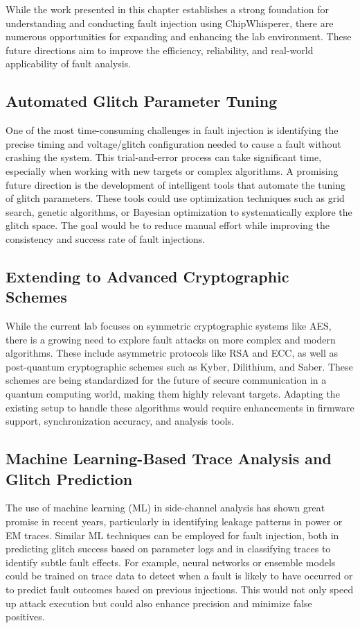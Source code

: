 While the work presented in this chapter establishes a strong foundation for understanding and conducting fault injection using ChipWhisperer, there are numerous opportunities for expanding and enhancing the lab environment. These future directions aim to improve the efficiency, reliability, and real-world applicability of fault analysis.

\subsection*{Automated Glitch Parameter Tuning}
One of the most time-consuming challenges in fault injection is identifying the precise timing and voltage/glitch configuration needed to cause a fault without crashing the system. This trial-and-error process can take significant time, especially when working with new targets or complex algorithms. A promising future direction is the development of intelligent tools that automate the tuning of glitch parameters. These tools could use optimization techniques such as grid search, genetic algorithms, or Bayesian optimization to systematically explore the glitch space. The goal would be to reduce manual effort while improving the consistency and success rate of fault injections.

\subsection*{Extending to Advanced Cryptographic Schemes}
While the current lab focuses on symmetric cryptographic systems like AES, there is a growing need to explore fault attacks on more complex and modern algorithms. These include asymmetric protocols like RSA and ECC, as well as post-quantum cryptographic schemes such as Kyber, Dilithium, and Saber. These schemes are being standardized for the future of secure communication in a quantum computing world, making them highly relevant targets. Adapting the existing setup to handle these algorithms would require enhancements in firmware support, synchronization accuracy, and analysis tools.

\subsection*{Machine Learning-Based Trace Analysis and Glitch Prediction}
The use of machine learning (ML) in side-channel analysis has shown great promise in recent years, particularly in identifying leakage patterns in power or EM traces. Similar ML techniques can be employed for fault injection, both in predicting glitch success based on parameter logs and in classifying traces to identify subtle fault effects. For example, neural networks or ensemble models could be trained on trace data to detect when a fault is likely to have occurred or to predict fault outcomes based on previous injections. This would not only speed up attack execution but could also enhance precision and minimize false positives.

